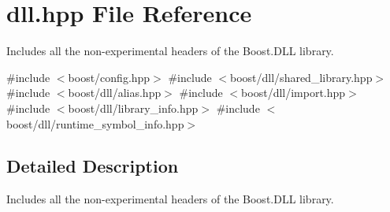 \hypertarget{a00278}{}\section{dll.\+hpp File Reference}
\label{a00278}


Includes all the non-\/experimental headers of the Boost.\+D\+LL library.  


{\ttfamily \#include $<$boost/config.\+hpp$>$}\newline
{\ttfamily \#include $<$boost/dll/shared\+\_\+library.\+hpp$>$}\newline
{\ttfamily \#include $<$boost/dll/alias.\+hpp$>$}\newline
{\ttfamily \#include $<$boost/dll/import.\+hpp$>$}\newline
{\ttfamily \#include $<$boost/dll/library\+\_\+info.\+hpp$>$}\newline
{\ttfamily \#include $<$boost/dll/runtime\+\_\+symbol\+\_\+info.\+hpp$>$}\newline


\subsection{Detailed Description}
Includes all the non-\/experimental headers of the Boost.\+D\+LL library. 

